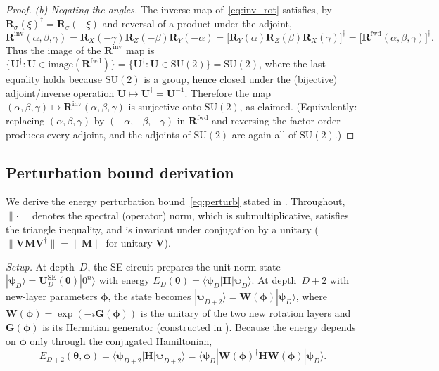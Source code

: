 \documentclass[11pt]{article}
\newcommand{\SU}{\mathrm{SU}}
\theoremstyle{plain}
\theoremstyle{plain}
\begin{document}
\begin{proof}
\emph{(b) Negating the angles.}
The inverse map of~\eqref{eq:inv_rot} satisfies, by
$\mathbf{R}_\sigma(\xi)^\dagger=\mathbf{R}_\sigma(-\xi)$ and reversal of a product
under the adjoint,
\begin{equation}\label{eq:inv_is_adjoint}
  \mathbf{R}^{\mathrm{inv}}(\alpha,\beta,\gamma)
  = \mathbf{R}_X(-\gamma) \mathbf{R}_Z(-\beta) \mathbf{R}_Y(-\alpha)
  = \bigl[\mathbf{R}_Y(\alpha) \mathbf{R}_Z(\beta) \mathbf{R}_X(\gamma)\bigr]^\dagger
  = \bigl[\mathbf{R}^{\mathrm{fwd}}(\alpha,\beta,\gamma)\bigr]^\dagger.
\end{equation}
Thus the image of the $\mathbf{R}^{\mathrm{inv}}$ map is
$\{\mathbf{U}^\dagger:\mathbf{U}\in\mathrm{image}(\mathbf{R}^{\mathrm{fwd}})\}
=\{\mathbf{U}^\dagger:\mathbf{U}\in\SU(2)\}=\SU(2)$, where the last equality holds
because $\SU(2)$ is a group, hence closed under the (bijective)
adjoint/inverse operation $\mathbf{U}\mapsto\mathbf{U}^\dagger=\mathbf{U}^{-1}$. Therefore
the map $(\alpha,\beta,\gamma)\mapsto\mathbf{R}^{\mathrm{inv}}(\alpha,\beta,\gamma)$
is surjective onto $\SU(2)$, as claimed. (Equivalently: replacing
$(\alpha,\beta,\gamma)$ by $(-\alpha,-\beta,-\gamma)$ in
$\mathbf{R}^{\mathrm{fwd}}$ and reversing the factor order produces every
adjoint, and the adjoints of $\SU(2)$ are again all of $\SU(2)$.)
\end{proof}
\subsection{Perturbation bound derivation}\label{app:perturb}
We derive the energy perturbation bound~\eqref{eq:perturb} stated in
.  Throughout, $\|\cdot\|$ denotes the spectral
(operator) norm, which is submultiplicative, satisfies the triangle
inequality, and is invariant under conjugation by a unitary
($\|\mathbf{V}\mathbf{M}\mathbf{V}^\dagger\|=\|\mathbf{M}\|$ for unitary
$\mathbf{V}$).

\emph{Setup.}
At depth~$D$, the SE circuit prepares the unit-norm state
$|\boldsymbol{\psi}_D\rangle=\mathbf{U}_D^{\mathrm{SE}}(\bm\theta)|0^n\rangle$ with energy
$E_D(\bm\theta)=\langle\boldsymbol{\psi}_D|\mathbf{H}|\boldsymbol{\psi}_D\rangle$.  At depth~$D{+}2$
with new-layer parameters $\bm\phi$, the state becomes
$|\boldsymbol{\psi}_{D+2}\rangle=\mathbf{W}(\bm\phi)|\boldsymbol{\psi}_D\rangle$, where
$\mathbf{W}(\bm\phi)=\exp(-i\mathbf{G}(\bm\phi))$ is the unitary of the two new
rotation layers and $\mathbf{G}(\bm\phi)$ is its Hermitian generator
(constructed in ).  Because the energy
depends on $\bm\phi$ only through the conjugated Hamiltonian,
\begin{equation}\label{eq:energy_as_conj}
  E_{D+2}(\bm\theta,\bm\phi)
  =\langle\boldsymbol{\psi}_{D+2}|\mathbf{H}|\boldsymbol{\psi}_{D+2}\rangle
  =\langle\boldsymbol{\psi}_D| \mathbf{W}(\bm\phi)^\dagger\mathbf{H} \mathbf{W}(\bm\phi) |\boldsymbol{\psi}_D\rangle .
\end{equation}
\end{document}
